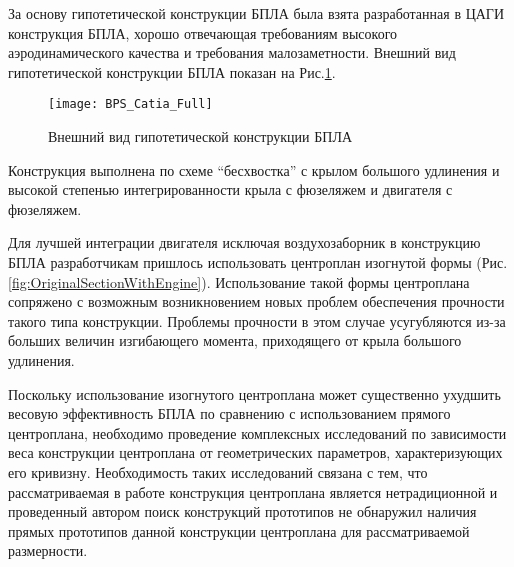 



За основу гипотетической конструкции БПЛА была взята разработанная в ЦАГИ конструкция БПЛА, хорошо отвечающая требованиям высокого аэродинамического качества и требования малозаметности. Внешний вид гипотетической конструкции БПЛА показан на Рис.\ref{fig:BPLA_TSAGI}.
 

  
  



\begin{figure}[ht]
\centering
\texttt{[image: BPS\_Catia\_Full]}
\caption{Внешний вид гипотетической конструкции БПЛА}
\label{fig:BPLA_TSAGI}
\end{figure}

Конструкция выполнена по схеме ``бесхвостка'' с крылом большого удлинения и высокой степенью интегрированности крыла с фюзеляжем и двигателя с фюзеляжем. 

Для лучшей интеграции двигателя исключая воздухозаборник в конструкцию БПЛА разработчикам пришлось использовать центроплан изогнутой формы (Рис.\ref{fig:OriginalSectionWithEngine}). Использование такой формы центроплана сопряжено с возможным возникновением новых проблем обеспечения прочности такого типа конструкции. Проблемы прочности в этом случае усугубляются из-за больших величин изгибающего момента, приходящего от крыла большого удлинения. 

Поскольку использование изогнутого центроплана может существенно ухудшить весовую эффективность БПЛА по сравнению с использованием прямого центроплана, необходимо проведение комплексных исследований по зависимости веса конструкции центроплана от геометрических параметров, характеризующих его кривизну. 
Необходимость таких исследований связана с тем, что рассматриваемая в работе конструкция центроплана является нетрадиционной и проведенный автором поиск конструкций прототипов не обнаружил наличия прямых прототипов данной конструкции центроплана для рассматриваемой размерности.

 

